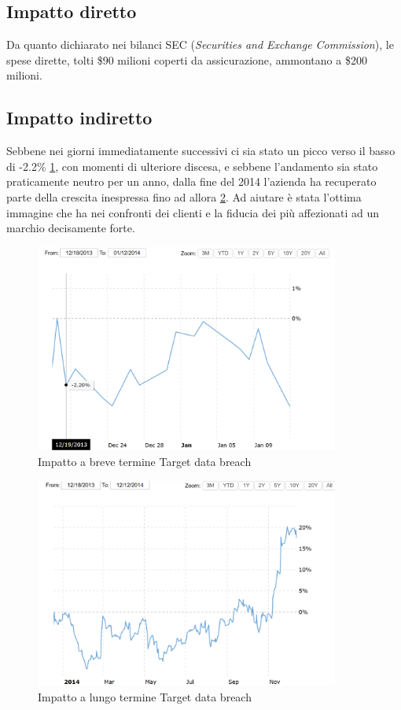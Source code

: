 \documentclass[12pt,a4paper,openright,twoside]{report}
\begin{document}
\subsection{Impatto diretto}
Da quanto dichiarato nei bilanci SEC (\textit{Securities and Exchange Commission}), le spese dirette, tolti \$90 milioni coperti da assicurazione, ammontano a \$200 milioni\cite{Target}.
\subsection{Impatto indiretto}
Sebbene nei giorni immediatamente successivi ci sia stato un picco verso il basso di -2.2\% \ref{fig:tgt1}, con momenti di ulteriore discesa, e sebbene l'andamento sia stato praticamente neutro per un anno, dalla fine del 2014 l'azienda ha recuperato parte della crescita inespressa fino ad allora \ref{fig:tgt2}. Ad aiutare \`e stata l'ottima immagine che ha nei confronti dei clienti e la fiducia dei pi\`u affezionati ad un marchio decisamente forte.\\
\begin{figure}[H] 
\begin{center} 
\includegraphics[width=10cm]{figures/target_short.png} 
\caption[Grafico Target short]{Impatto a breve termine Target data breach}\label{fig:tgt1}
\end{center}
\end{figure}
\begin{figure}[H]
\begin{center} 
\includegraphics[width=10cm]{figures/target_long.png} 
\caption[Grafico Target long]{Impatto a lungo termine Target data breach}\label{fig:tgt2}
\end{center}
\end{figure}
\end{document}
